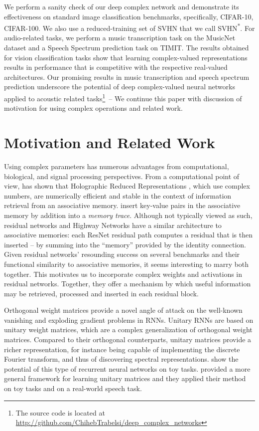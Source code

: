 \documentclass{article}
\begin{document}
We perform a sanity check of our deep complex network and demonstrate its effectiveness on standard image classification benchmarks, specifically, CIFAR-10, CIFAR-100. We also use a reduced-training set of SVHN that we call SVHN\textsuperscript{*}. For audio-related tasks, we perform a music transcription task on the MusicNet dataset and a Speech Spectrum prediction task on TIMIT. The results obtained for vision classification tasks show that learning complex-valued representations results in performance that is competitive with the respective real-valued architectures. Our promising results in music transcription and speech spectrum prediction underscore the potential of deep complex-valued neural networks applied to acoustic related tasks\footnote{The source code is located at \url{http://github.com/ChihebTrabelsi/deep_complex_networks}}~--
We continue this paper with discussion of motivation for using complex operations and related work.

\section{Motivation and Related Work}
Using complex parameters has numerous advantages from computational, biological, and signal processing perspectives. From a computational point of view, \cite{danihelka2016associative} has shown  that Holographic Reduced Representations \citep{plate2003holographic}, which use complex numbers, are numerically efficient and stable in the context of information retrieval from an associative memory. \citet{danihelka2016associative} insert key-value pairs in the associative memory by addition into a \textit{memory trace}. Although not typically viewed as such, residual networks \citep{he2015deep, he2016identity} and Highway Networks \citep{srivastava2015training} have a similar architecture to associative memories: each ResNet residual path computes a residual that is then inserted -- by summing into the ``memory'' provided by the identity connection. Given residual networks' resounding success on several benchmarks and their functional similarity to associative memories, it seems interesting to marry both together. This motivates us to incorporate complex weights and activations in residual networks. Together, they offer a mechanism by which useful information may be retrieved, processed and inserted in each residual block.

Orthogonal weight matrices provide a novel angle of attack on the well-known vanishing and exploding gradient problems in RNNs. Unitary RNNs \citep{arjovsky2015unitary} are based on unitary weight matrices, which are a complex generalization of orthogonal weight matrices. Compared to their orthogonal counterparts, unitary matrices provide a richer representation, for instance being capable of implementing the discrete Fourier transform, and thus of discovering spectral representations. \cite{arjovsky2015unitary} show the potential of this type of recurrent neural networks on toy tasks. \cite{wisdom2016full} provided a more general framework for learning unitary matrices and they applied their method on toy tasks and on a real-world speech task.
\end{document}
